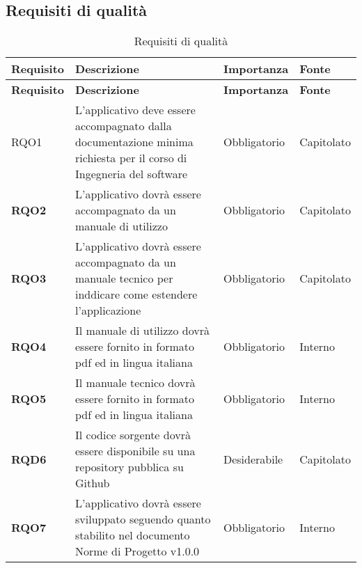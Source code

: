 \subsection{Requisiti di qualità}
\label{sub:requisiti_di_qualita}

\renewcommand{\arraystretch}{2} %
\begin{longtable}[H]{>{\centering\bfseries}m{2cm} >{\centering}m{9cm} >{\centering}m{2.5cm} >{\centering\arraybackslash}m{2.5cm}}
    \caption{Requisiti di qualità}%
    \label{tab:requisiti_di_qualita} \\
    \rowcolor{lightgray}
    {\textbf{Requisito}} & {\textbf{Descrizione}} & {\textbf{Importanza}} & {\textbf{Fonte}}  \\
    \endfirsthead%
    \rowcolor{lightgray}
    {\textbf{Requisito}} & {\textbf{Descrizione}} & {\textbf{Importanza}} & {\textbf{Fonte}}  \\
    \endhead%
    \rowcolor{white}
    \multicolumn{4}{c}{\textit{Continua alla pagina successiva}}
    \endfoot%
    \endlastfoot%

    RQO1
        & L'applicativo deve essere accompagnato dalla documentazione minima richiesta per il corso di Ingegneria del software
        & Obbligatorio
        & Capitolato \\

    RQO2
        & L'applicativo dovrà essere accompagnato da un manuale di utilizzo
        & Obbligatorio
        & Capitolato \\

    RQO3
        & L'applicativo dovrà essere accompagnato da un manuale tecnico per inddicare come estendere l'applicazione
        & Obbligatorio
        & Capitolato \\

    RQO4
        & Il manuale di utilizzo dovrà essere fornito in formato pdf ed in lingua italiana
        & Obbligatorio
        & Interno \\

    RQO5
        & Il manuale tecnico dovrà essere fornito in formato pdf ed in lingua italiana
        & Obbligatorio
        & Interno \\

    RQD6
        & Il codice sorgente dovrà essere disponibile su una repository pubblica su Github
        & Desiderabile
        & Capitolato \\

    RQO7
        & L'applicativo dovrà essere sviluppato seguendo quanto stabilito nel documento Norme di Progetto v1.0.0
        & Obbligatorio
        & Interno

\end{longtable}
